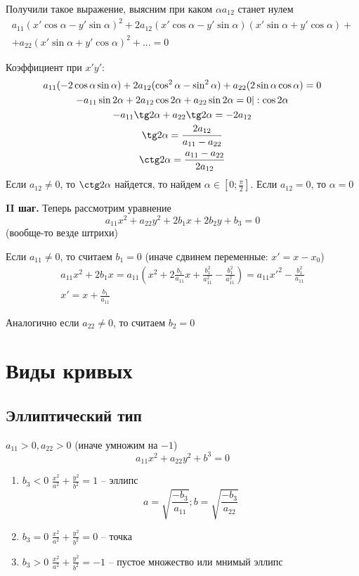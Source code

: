 \documentclass[main]{subfiles}
\begin{document}
Получили такое выражение, выясним при каком $\alpha a_{12}$ станет нулем
\begin{multline*}
    a_{11} (x' \cos \alpha - y' \sin \alpha)^2 + 2a_{12} (x' \cos \alpha - y' \sin \alpha)(x' \sin \alpha + y' \cos \alpha) + \\
    + a_{22} (x' \sin \alpha + y' \cos \alpha)^2 + ... = 0
\end{multline*}

Коэффициент при $x'y'$:
\begin{gather*}
    a_{11}(-2\cos\alpha\sin\alpha) + 2 a_{12} (\cos^2 \alpha - \sin^2 \alpha)
    + a_{22}(2\sin\alpha \cos\alpha) = 0\\
    -a_{11} \sin 2\alpha + 2a_{12} \cos 2\alpha + a_{22} \sin 2 \alpha=0 |:\cos2\alpha\\
    -a_{11} \tg 2 \alpha + a_{22} \tg 2 \alpha = -2 a_{12}\\
    \tg 2 \alpha = \frac{2 a_{12}}{a_{11} - a_{22}}\\
    \ctg 2 \alpha = \frac{a_{11} - a_{22}}{2a_{12}}
\end{gather*}
Если $a_{12} \neq 0$, то $\ctg 2 \alpha$ найдется, то найдем $\alpha \in \left[0; \frac{\pi}{2}\right]$.
Если $a_{12} = 0$, то $\alpha = 0$

\textbf{II шаг. } Теперь рассмотрим уравнение
\[a_{11} x^2 + a_{22} y^2 + 2b_1 x + 2 b_2y +b_3 = 0\]
(вообще-то везде штрихи)

\begin{lemma}
    Если $a_{11} \neq 0$, то считаем $b_1 = 0$ (иначе сдвинем переменные: $x' = x - x_0$)
    \begin{gather*}
        a_{11} x^2 + 2 b_1 x =
        a_{11}\left(x^2+2\frac{b_1}{a_{11}}x + \frac{b_1^2}{a_{11}^2} -  \frac{b_1^2}{a_{11}^2}\right) =
        a_{11} x'^2 - \frac{b_1^2}{a_{11}}\\
        x' = x + \frac{b_1}{a_{11}}
    \end{gather*}

    Аналогично если $a_{22} \neq 0 $, то считаем $b_2=0$
\end{lemma}

\section{Виды кривых}
\subsection{Эллиптический тип}
$a_{11}>0, a_{22} > 0$ (иначе умножим на $-1$)
\[a_{11} x^2 + a_{22} y^2 + b^3 = 0\]
\begin{enumerate}
    \item $b_3 < 0$ $ \frac{x^2}{a^2} + \frac{y^2}{b^2} = 1$ -- эллипс
          \[a = \sqrt{\frac{-b_3}{a_{11}}}; b = \sqrt{\frac{-b_3}{a_{22}}}\]
    \item $b_3 = 0$ $ \frac{x^2}{a^2} + \frac{y^2}{b^2} = 0$ -- точка
    \item $b_3> 0$ $ \frac{x^2}{a^2} + \frac{y^2}{b^2} = -1$ -- пустое множество или мнимый эллипс
\end{enumerate}
\end{document}
